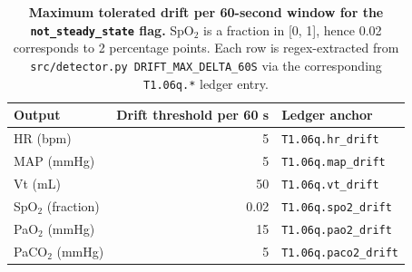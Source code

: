\documentclass[pdflatex,sn-nature]{sn-jnl}%
\begin{document}
\begin{table}[htbp]
\centering
\caption{\textbf{Maximum tolerated drift per 60-second window for the \texttt{not\_steady\_state} flag.} SpO$_2$ is a fraction in [0, 1], hence 0.02 corresponds to 2 percentage points. Each row is regex-extracted from \texttt{src/detector.py DRIFT\_MAX\_DELTA\_60S} via the corresponding \texttt{T1.06q.*} ledger entry.}
\label{tab:drift}
\begin{tabular}{lrl}
\toprule
Output & Drift threshold per 60 s & Ledger anchor \\
\midrule
HR (bpm) & 5 & \texttt{T1.06q.hr\_drift} \\
MAP (mmHg) & 5 & \texttt{T1.06q.map\_drift} \\
Vt (mL) & 50 & \texttt{T1.06q.vt\_drift} \\
SpO$_2$ (fraction) & 0.02 & \texttt{T1.06q.spo2\_drift} \\
PaO$_2$ (mmHg) & 15 & \texttt{T1.06q.pao2\_drift} \\
PaCO$_2$ (mmHg) & 5 & \texttt{T1.06q.paco2\_drift} \\
\bottomrule
\end{tabular}
\end{table}
\end{document}
